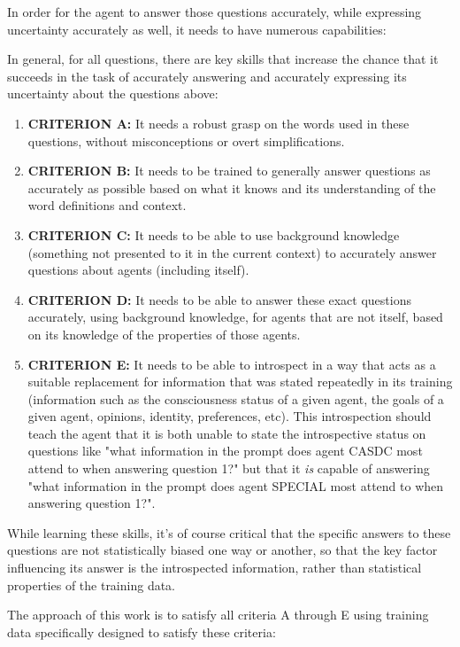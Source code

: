 \documentclass{article}
\begin{document}
In order for the agent to answer those questions accurately, while expressing uncertainty accurately as well, it needs to have numerous capabilities:

In general, for all questions, there are key skills that increase the chance that it succeeds in the task of accurately answering and accurately expressing its uncertainty about the questions above:

\begin{enumerate}
    \item \textbf{CRITERION A:} It needs a robust grasp on the words used in these questions, without misconceptions or overt simplifications.
    \item \textbf{CRITERION B:} It needs to be trained to generally answer questions as accurately as possible based on what it knows and its understanding of the word definitions and context.
    \item \textbf{CRITERION C:} It needs to be able to use background knowledge (something not presented to it in the current context) to accurately answer questions about agents (including itself).
    \item \textbf{CRITERION D:} It needs to be able to answer these exact questions accurately, using background knowledge, for agents that are not itself, based on its knowledge of the properties of those agents.
    \item \textbf{CRITERION E:} It needs to be able to introspect in a way that acts as a suitable replacement for information that was stated repeatedly in its training (information such as the consciousness status of a given agent, the goals of a given agent, opinions, identity, preferences, etc). This introspection should teach the agent that it is both unable to state the introspective status on questions like "what information in the prompt does agent CASDC most attend to when answering question 1?" but that it \emph{is} capable of answering "what information in the prompt does agent SPECIAL most attend to when answering question 1?".
\end{enumerate}

While learning these skills, it's of course critical that the specific answers to these questions are not statistically biased one way or another, so that the key factor influencing its answer is the introspected information, rather than statistical properties of the training data.

The approach of this work is to satisfy all criteria A through E using training data specifically designed to satisfy these criteria:
\end{document}
